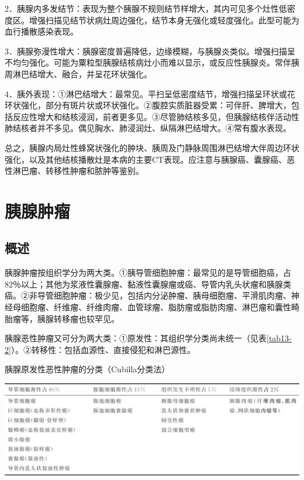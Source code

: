 2．胰腺内多发结节：表现为整个胰腺不规则结节样增大，其内可见多个灶性低密度区。增强扫描见结节状病灶周边强化，结节本身无强化或轻度强化。此型可能为血行播散感染表现。

3．胰腺弥漫性增大：胰腺密度普遍降低，边缘模糊，与胰腺炎类似。增强扫描呈不均匀强化。可能为粟粒型胰腺结核病灶小而难以显示，或反应性胰腺炎。常伴胰周淋巴结增大、融合，并呈花环状强化。

4．胰外表现：①淋巴结增大：最常见。平扫呈低密度结节，增强扫描呈环状或花环状强化，部分有斑片状或环状强化。②腹腔实质脏器受累：可伴肝、脾增大，包括反应性增大和结核浸润，前者更多见。③尽管肺结核多见，但胰腺结核伴活动性肺结核者并不多见。偶见胸水、肺浸润灶、纵隔淋巴结增大。④常有腹水表现。

总之，胰腺内局灶性蜂窝状强化的肿块、胰周及门静脉周围淋巴结增大伴周边环状强化，以及其他结核播散灶是本病的主要CT表现。应注意与胰腺癌、囊腺癌、恶性淋巴瘤、转移性肿瘤和脓肿等鉴别。

\section{胰腺肿瘤}

\subsection{概述}

胰腺肿瘤按组织学分为两大类。①胰导管细胞肿瘤：最常见的是导管细胞癌，占82％以上；其他为浆液性囊腺瘤、黏液性囊腺瘤或癌、导管内乳头状瘤和胰腺类癌。②非导管细胞肿瘤：极少见，包括内分泌肿瘤、胰母细胞瘤、平滑肌肉瘤、神经母细胞瘤、纤维瘤、纤维肉瘤、血管球瘤、脂肪瘤或脂肪肉瘤、淋巴瘤和囊性畸胎瘤等，胰腺转移瘤也较罕见。

胰腺恶性肿瘤又可分为两大类：①原发性：其组织学分类尚未统一（见表\ref{tab13-2}）。②转移性：包括血源性、直接侵犯和淋巴源性。

\begin{table}[htbp]
\centering
\caption{胰腺原发性恶性肿瘤的分类（Cubilla分类法）}
\label{tab13-2}
\includegraphics[width=\textwidth,height=\textheight,keepaspectratio]{./images/Image00303.jpg}
\end{table}


